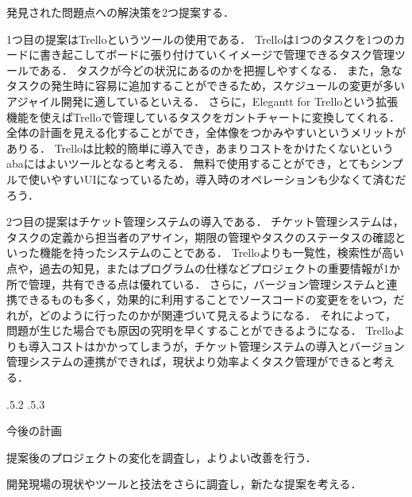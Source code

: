 \documentclass[uplatex]{jsarticle}
\makeatletter
\renewcommand{\section}{%
    \if@slide\clearpage\fi
    \@startsection{section}{1}{\z@}%
    {\Cvs \@plus.5\Cdp \@minus.2\Cdp}%
    {.5\Cvs \@plus.3\Cdp}%
    {\normalfont\raggedright}}
\makeatother
\begin{document}
発見された問題点への解決策を2つ提案する．

1つ目の提案はTrelloというツールの使用である．
Trelloは1つのタスクを1つのカードに書き起こしてボードに張り付けていくイメージで管理できるタスク管理ツールである．
タスクが今どの状況にあるのかを把握しやすくなる．
また，急なタスクの発生時に容易に追加することができるため，スケジュールの変更が多いアジャイル開発に適しているといえる．
さらに，Elegantt for Trelloという拡張機能を使えばTrelloで管理しているタスクをガントチャートに変換してくれる．
全体の計画を見える化することができ，全体像をつかみやすいというメリットがありる．
Trelloは比較的簡単に導入でき，あまりコストをかけたくないというabaにはよいツールとなると考える．
無料で使用することができ，とてもシンプルで使いやすいUIになっているため，導入時のオペレーションも少なくて済むだろう．

2つ目の提案はチケット管理システムの導入である\cite{ikeda2014}．
チケット管理システムは，タスクの定義から担当者のアサイン，期限の管理やタスクのステータスの確認といった機能を持ったシステムのことである．
Trelloよりも一覧性，検索性が高い点や，過去の知見，またはプログラムの仕様などプロジェクトの重要情報が1か所で管理，共有できる点は優れている．
さらに，バージョン管理システムと連携できるものも多く，効果的に利用することでソースコードの変更ををいつ，だれが，どのように行ったのかが関連づいて見えるようになる．
それによって，問題が生じた場合でも原因の究明を早くすることができるようになる．
Trelloよりも導入コストはかかってしまうが，チケット管理システムの導入とバージョン管理システムの連携ができれば，現状より効率よくタスク管理ができると考える．



\section{今後の計画}

提案後のプロジェクトの変化を調査し，よりよい改善を行う．

開発現場の現状やツールと技法をさらに調査し，新たな提案を考える．




\end{document}
